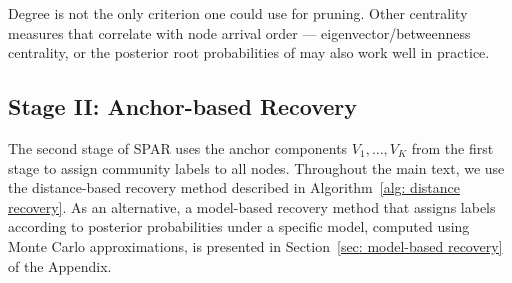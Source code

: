 \documentclass[twoside,11pt]{article}
\theoremstyle{remark}
\begin{document}
\begin{remark}
\label{remark: different pruning criterion}
Degree is not the only criterion one could use for pruning. Other centrality measures that correlate with node arrival order — eigenvector/betweenness centrality, or the posterior root probabilities of \cite{crane2024root} may also work well in practice. %
\end{remark}

% 


\subsection{Stage II: Anchor-based Recovery}

The second stage of SPAR uses the anchor components ${V_1, \ldots, V_K}$ from the first stage to assign community labels to all nodes. Throughout the main text, we use the distance-based recovery method described in Algorithm~\ref{alg: distance recovery}. As an alternative, a model-based recovery method that assigns labels according to posterior probabilities under a specific model, computed using Monte Carlo approximations, is presented in Section~\ref{sec: model-based recovery} of the Appendix.
\end{document}
